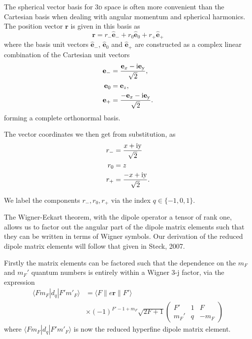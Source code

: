     The spherical vector basis for \textsc{3d} space is often more convenient
    than the Cartesian basis when dealing with angular momentum and spherical
    harmonics. The position vector $\mathbf{r}$ is given in this basis as
    \begin{equation}
      \mathbf{r} = r_- \hat{\mathbf{e}}_- + r_0 \hat{\mathbf{e}}_0 + 
        r_+ \hat{\mathbf{e}}_+
    \end{equation}
    where the basis unit vectors $\hat{\mathbf{e}}_-$, $\hat{\mathbf{e}}_0$ and
    $\hat{\mathbf{e}}_+$ are constructed as a complex linear combination of the
    Cartesian unit vectors
    \begin{align}
      \mathbf{e}_- &= \frac{\mathbf{e}_x - \rm{i} \mathbf{e}_y }{\sqrt{2}}, \\
      \mathbf{e}_0 &= \mathbf{e}_z, \\
      \mathbf{e}_+ &= \frac{-\mathbf{e}_x - \rm{i} \mathbf{e}_y }{\sqrt{2}}.
    \end{align}
    forming a complete orthonormal basis.

    The vector coordinates we then get from substitution, as
    \begin{align}
      r_- &= \frac{x + \rm{i} y }{\sqrt{2}} \\
      r_0 &= z \\
      r_+ &= \frac{-x + \rm{i} y }{\sqrt{2}}.
    \end{align}

    We label the components $r_-, r_0, r_+$ via the index $q \in \{ -1, 0, 1\}$.

    The Wigner-Eckart theorem\cite{wigner1959group,RevModPhys.2.305}, with the
    dipole operator a tensor of rank one, allows us to factor out the angular
    part of the dipole matrix elements such that they can be written in terms of
    Wigner symbols. Our derivation of the reduced dipole matrix elements will
    follow that given in Steck, 2007.\cite{Steck2007}

    Firstly the matrix elements can be factored such that the dependence on the
    $m_F$ and $m_F'$ quantum numbers is entirely within a Wigner 3-j factor, via
    the expression
    \begin{align}
      \langle F m_F | d_q | F' m'_F \rangle &= 
      \langle F  \| e \mathbf{r} \| F' \rangle \nonumber \\
      &\times (-1)^{F' - 1 + m_F} \sqrt{2F + 1}
      \begin{pmatrix}
        F' & 1 & F \\
        m_F' & q & -m_F 
      \end{pmatrix}
      \label{eqn:red_hf_tdme}
    \end{align}
    where $\langle F m_F | d_q | F' m'_F \rangle$ is now the reduced hyperfine
    dipole matrix element.

